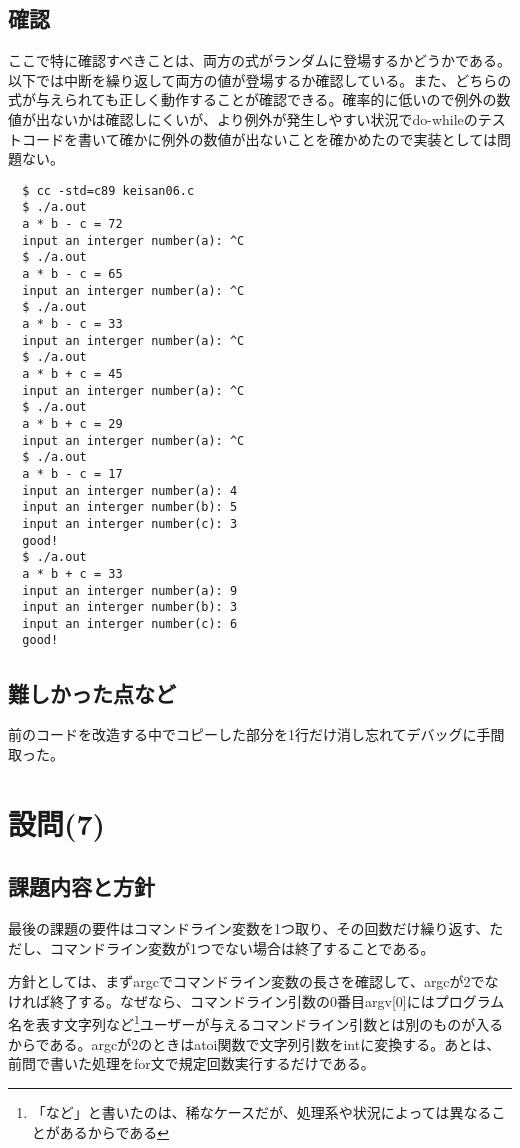 \documentclass[dvipdfmx,12pt,a4j]{jarticle}
\begin{document}
\subsection{確認}
ここで特に確認すべきことは、両方の式がランダムに登場するかどうかである。以下では中断を繰り返して両方の値が登場するか確認している。また、どちらの式が与えられても正しく動作することが確認できる。確率的に低いので例外の数値が出ないかは確認しにくいが、より例外が発生しやすい状況でdo-whileのテストコードを書いて確かに例外の数値が出ないことを確かめたので実装としては問題ない。
\begin{verbatim}
  $ cc -std=c89 keisan06.c
  $ ./a.out
  a * b - c = 72
  input an interger number(a): ^C
  $ ./a.out
  a * b - c = 65
  input an interger number(a): ^C
  $ ./a.out
  a * b - c = 33
  input an interger number(a): ^C
  $ ./a.out
  a * b + c = 45
  input an interger number(a): ^C
  $ ./a.out
  a * b + c = 29
  input an interger number(a): ^C
  $ ./a.out
  a * b - c = 17
  input an interger number(a): 4
  input an interger number(b): 5
  input an interger number(c): 3
  good!
  $ ./a.out
  a * b + c = 33
  input an interger number(a): 9
  input an interger number(b): 3
  input an interger number(c): 6
  good!
\end{verbatim}

\subsection{難しかった点など}
前のコードを改造する中でコピーした部分を1行だけ消し忘れてデバッグに手間取った。

\section{設問(7)}
\subsection{課題内容と方針}
最後の課題の要件はコマンドライン変数を1つ取り、その回数だけ繰り返す、ただし、コマンドライン変数が1つでない場合は終了することである。

方針としては、まずargcでコマンドライン変数の長さを確認して、argcが2でなければ終了する。なぜなら、コマンドライン引数の0番目argv[0]にはプログラム名を表す文字列など\footnote{「など」と書いたのは、稀なケースだが、処理系や状況によっては異なることがあるからである}ユーザーが与えるコマンドライン引数とは別のものが入るからである。argcが2のときはatoi関数で文字列引数をintに変換する。あとは、前問で書いた処理をfor文で規定回数実行するだけである。
\end{document}
